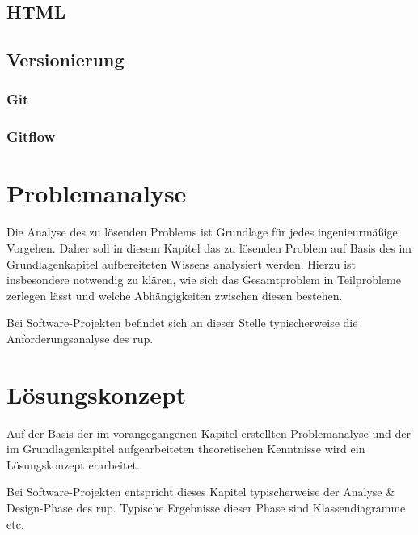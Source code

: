 \documentclass[oneside]{ausarbeitung}
\begin{document}

\section{HTML}
\label{sec:html}


\section{Versionierung}
\label{sec:versionierung}

\subsection{Git}
\label{sub:git}

\subsection{Gitflow}
\label{sub:gitflow}

\chapter{Problemanalyse}
\label{cha:problemanalyse}

Die Analyse des zu lösenden Problems ist Grundlage für jedes 
ingenieurmäßige Vorgehen. Daher soll in diesem Kapitel das zu lösenden 
Problem auf Basis des im Grundlagenkapitel aufbereiteten Wissens 
analysiert werden. Hierzu ist insbesondere notwendig zu klären, wie sich 
das Gesamtproblem in Teilprobleme zerlegen lässt und welche 
Abhängigkeiten zwischen diesen bestehen.

Bei Software-Projekten befindet sich an dieser Stelle typischerweise die 
Anforderungsanalyse des \ac{rup}.

\chapter{Lösungskonzept}
\label{cha:loesungskonzept}

Auf der Basis der im vorangegangenen Kapitel erstellten Problemanalyse 
und der im Grundlagenkapitel aufgearbeiteten theoretischen Kenntnisse 
wird ein Lösungskonzept erarbeitet.

Bei Software-Projekten entspricht dieses Kapitel typischerweise der 
Analyse \& Design-Phase des \ac{rup}. Typische Ergebnisse dieser Phase sind 
Klassendiagramme etc.
\end{document}
